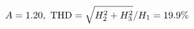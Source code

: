 \documentclass[preview]{standalone}
\begin{document}
\begin{align*}
\special{dvisvgm:raw <g id='unique000'>}A=1.20,\ \text{THD}=\sqrt{H_2^2+H_3^2}/H_1=19.9\%\special{dvisvgm:raw </g>}
\end{align*}
\end{document}
